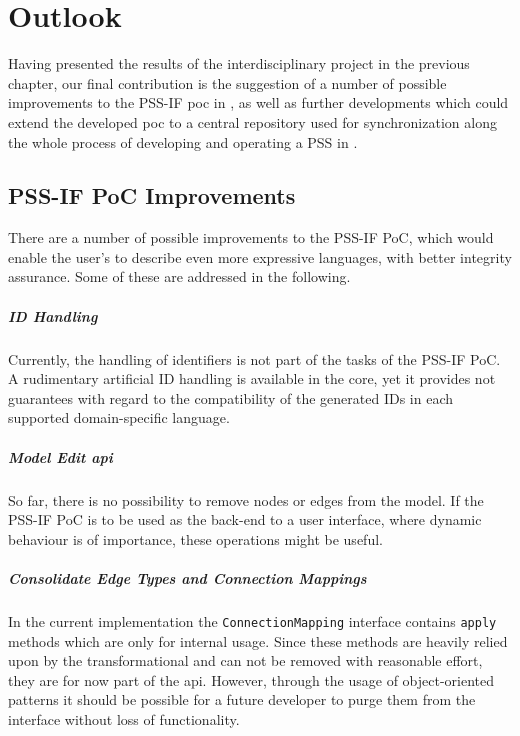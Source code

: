 \chapter{Outlook}
\label{chap:outlook}

Having presented the results of the interdisciplinary project in the previous chapter, our final contribution is the suggestion of a number of possible improvements to the PSS-IF \gls{poc} in , as well as further developments which could extend the developed \gls{poc} to a central repository used for synchronization along the whole process of developing and operating a \gls{PSS} in .

\section{PSS-IF PoC Improvements}
\label{sec:outlook:improvements}

There are a number of possible improvements to the PSS-IF PoC, which would enable the user's to describe even more expressive languages, with better integrity assurance. Some of these are addressed in the following.

\paragraph{ID Handling}

Currently, the handling of identifiers is not part of the tasks of the PSS-IF PoC. A rudimentary artificial ID handling is available in the core, yet it provides not guarantees with regard to the compatibility of the generated IDs in each supported domain-specific language.

\paragraph{Model Edit \gls{api}}

So far, there is no possibility to remove nodes or edges from the model. If the PSS-IF PoC is to be used as the back-end to a user interface, where dynamic behaviour is of importance, these operations might be useful.

\paragraph{Consolidate Edge Types and Connection Mappings}

In the current implementation the \texttt{ConnectionMapping} interface contains \texttt{apply} methods which are only for internal usage. Since these methods are heavily relied upon by the transformational and can not be removed with reasonable effort, they are for now part of the \gls{api}. However, through the usage of object-oriented patterns it should be possible for a future developer to purge them from the interface without loss of functionality.


